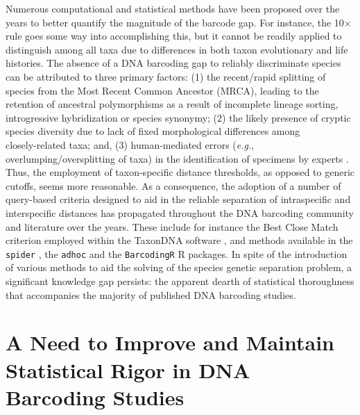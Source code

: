 Numerous computational and statistical methods have been proposed over the years to better quantify the magnitude of the barcode gap. For instance, the 10$\times$ rule goes some way into accomplishing this, but it cannot be readily applied to distinguish among all taxa due to differences in both taxon evolutionary and life histories. The absence of a DNA barcoding gap to reliably discriminate species can be attributed to three primary factors: (1) the recent/rapid splitting of species from the Most Recent Common Ancestor (MRCA), leading to the retention of ancestral polymorphisms as a result of incomplete lineage sorting, introgressive hybridization or species synonymy; (2) the likely presence of cryptic species diversity due to lack of fixed morphological differences among \\ closely-related taxa; and, (3) human-mediated errors (\textit{e.g.}, overlumping/oversplitting of taxa) in the identification of specimens by experts \cite{hubert2015dna, koroiva2018estimating}. Thus, the employment of taxon-specific distance thresholds, as opposed to generic cutoffs, seems more reasonable. As a consequence, the adoption of a number of query-based criteria designed to aid in the reliable separation of intraspecific and interspecific distances has propagated throughout the DNA barcoding community and literature over the years. These include for instance the Best Close Match criterion employed within the TaxonDNA software \cite{meier2006dna}, and methods available in the {\tt spider} \cite{brown2012spider}, the {\tt adhoc} \cite{sonet2013adhoc} and the {\tt BarcodingR} \cite{zhang2016barcoding} R packages. In spite of the introduction of various methods to aid the solving of the species genetic separation problem, a significant knowledge gap persists: the apparent dearth of statistical thoroughness that accompanies the majority of published DNA barcoding studies. 



\section{A Need to Improve and Maintain Statistical Rigor in DNA Barcoding Studies}

